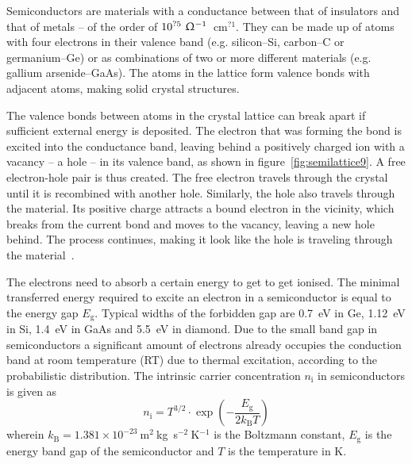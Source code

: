 Semiconductors are materials with a conductance between that of insulators and that of metals -- of the order of  $10^{?5}~\Upomega^{-1}$~cm$^{?1}$. They can be made up of atoms with four electrons in their valence band (e.g. silicon--Si, carbon--C or germanium--Ge) or as combinations of two or more different materials (e.g. gallium arsenide--GaAs). The atoms in the lattice form valence bonds with adjacent atoms, making solid crystal structures. 

The valence bonds between atoms in the crystal lattice can break apart if sufficient external energy is deposited. The electron that was forming the bond is excited into the conductance band, leaving behind a positively charged ion with a vacancy -- a hole -- in its valence band, as shown in figure~\ref{fig:semilattice9}. A free electron-hole pair is thus created. The free electron travels through the crystal until it is recombined with another hole. Similarly, the hole also travels through the material. Its positive charge attracts a bound electron in the vicinity, which breaks from the current bond and moves to the vacancy, leaving a new hole behind. The process continues, making it look like the hole is traveling through the material~\cite{}.




The electrons need to absorb a certain energy to get to get ionised. The minimal transferred energy required to excite an electron in a semiconductor is equal to the energy gap $E_\mathrm{g}$. Typical widths of the forbidden gap are 0.7~eV in Ge, 1.12~eV in Si, 1.4~eV in GaAs and 5.5~eV in diamond. Due to the small band gap in semiconductors a significant amount of electrons already occupies the conduction band at room temperature (RT) due to thermal excitation, according to the probabilistic distribution. The intrinsic carrier concentration $n_\mathrm{i}$ in semiconductors is given as
\begin{equation}
\label{eq:intrinsiccarrier}
n_\mathrm{i} = T^{3/2} \cdot \exp\left(-\frac{E_\mathrm{g}}{2k_\mathrm{B}T}\right)
\end{equation} 
wherein $k_\mathrm{B} = 1.381\times10^{-23}~$m$^2~$kg~s$^{-2}~$K$^{-1}$ is the Boltzmann constant, $E_\mathrm{g}$ is the energy band gap of the semiconductor and $T$ is the temperature in K. 

